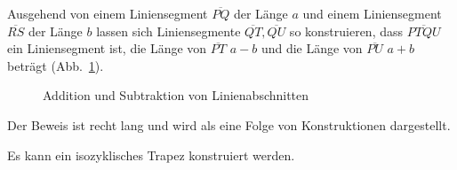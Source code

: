 \begin{theorem}\label{thm.add-subtract-mm}
Ausgehend von einem Liniensegment $\overline{PQ}$ der Länge $a$ und einem Liniensegment $\overline{RS}$ der Länge $b$ lassen sich Liniensegmente $\overline{QT}, \overline{QU}$ so konstruieren, dass $\overline{PTQU}$ ein Liniensegment ist, die Länge von $\overline{PT}$ $a-b$ und die Länge von $\overline{PU}$ $a+b$ beträgt (Abb.~\ref{f.compass-add1}).
\end{theorem}
\begin{figure}[ht]
\begin{center}
\end{center}
\caption{Addition und Subtraktion von Linienabschnitten}\label{f.compass-add1}
\end{figure}

Der Beweis ist recht lang und wird als eine Folge von Konstruktionen dargestellt.


\begin{theorem}\label{thm.compass-trapezoid}
Es kann ein isozyklisches Trapez konstruiert werden.
\end{theorem}

